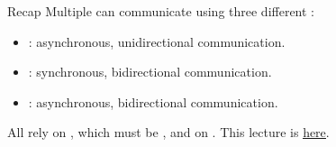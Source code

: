 
\begin{frame}{Recap}
  Multiple  can communicate using three different :
  \begin{itemize}
    \item {}: asynchronous, unidirectional communication.
    \item {}: synchronous, bidirectional communication.
    \item {}: asynchronous, bidirectional communication.
  \end{itemize}
  All rely on , which must be , and on .
  \newline\newline
  \newline\newline
  This lecture is \href{https://github.com/robmasocco/DAFN23_Robotics_4}{\color{blue}\underline{here}}.
\end{frame}
